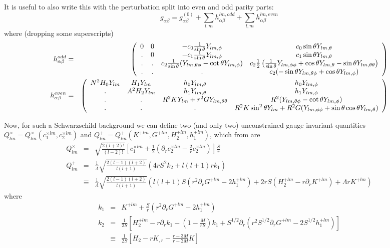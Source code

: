 \documentclass{article}
\begin{document}
It is useful to also write this with the perturbation split into even and odd parity parts:
$$
g_{\alpha\beta} = {g}^{(0)}_{\alpha\beta} +
   \sum_{l,m} h^{lm,odd}_{\alpha\beta}
+\sum_{l,m} h^{lm,even}_{\alpha\beta}
$$
where (dropping some superscripts)
\begin{eqnarray*}
h_{\alpha\beta}^{odd}
&=&
\left( 
\begin{array}{cccc}
0 & 0 &  - c_0\frac{1}{\sin\theta}Y_{lm,\phi}
    & c_0 \sin\theta Y_{lm,\theta}
\\
. & 0 & - c_1\frac{1}{\sin\theta} Y_{lm,\phi}
  & c_1 \sin\theta Y_{lm,\theta}
\\
. & . & c_2\frac{1}{\sin\theta}(Y_{lm,\theta\phi}-\cot\theta Y_{lm,\phi})  
  & c_2\frac{1}{2} \left(\frac{1}{\sin\theta}
          Y_{lm,\phi\phi}+\cos\theta Y_{lm,\theta}-\sin\theta Y_{lm,\theta\theta}\right)
\\
.&.&.&c_2 (-\sin\theta Y_{lm,\theta\phi}+\cos\theta Y_{lm,\phi})
\end{array}
\right)
\\
h_{\alpha\beta}^{even}
&=&
\left( 
\begin{array}{cccc}
N^2 H_0Y_{lm} & H_1Y_{lm}       & h_0Y_{lm,\theta}          & h_0 Y_{lm,\phi}             \\ 
.       & A^2H_2Y_{lm} & h_1Y_{lm,\theta}          & h_1 Y_{lm,\phi}             \\
.       & .           & R^2KY_{lm}+r^2GY_{lm,\theta\theta} & R^2(Y_{lm,\theta\phi}-\cot\theta Y_{lm,\phi}) \\
.       & .           & .                & R^2 K\sin^2\theta Y_{lm}+R^2G(Y_{lm,\phi\phi}+\sin\theta\cos\theta Y_{lm,\theta})
\end{array}
\right)
\end{eqnarray*}

Now, for such a Schwarzschild background we can define two (and only two)
unconstrained gauge invariant quantities 
  $Q^{\times}_{lm}=Q^{\times}_{lm}(c_1^{\times lm},c_2^{\times lm})$ 
and
  $Q^{+}_{lm}=Q^{+}_{lm}(K^{+ lm},G^{+ lm},H_2^{+lm},h_1^{+lm})$, 
which from
\cite{abrahams96a} are
\begin{eqnarray}
Q^{\times}_{lm} 
  & = & \sqrt{\frac{2(l+2)!}{(l-2)!}}\left[c_1^{\times lm}
        + \frac{1}{2}\left(\partial_r c_2^{\times lm} - \frac{2}{r}
        c_2^{\times lm}\right)\right] \frac{S}{r}
\\
Q^{+}_{lm}
  & = & \frac{1}{\Lambda}\sqrt{\frac{2(l-1)(l+2)}{l(l+1)}}
        (4rS^2 k_2+l(l+1)r k_1) 
\\
  & \equiv &
        \frac{1}{\Lambda}\sqrt{\frac{2(l-1)(l+2)}{l(l+1)}}
        \left(l(l+1)S(r^2\partial_r G^{+lm}-2h_1^{+lm})+
        2rS(H_2^{+lm}-r\partial_r K^{+lm})+\Lambda r K^{+lm}\right)
\end{eqnarray}
where
\begin{eqnarray}
k_1 & = & K^{+lm} + \frac{S}{r}(r^2\partial_r G^{+lm} - 2h^{+lm}_1) \\
k_2 & = & \frac{1}{2S}
          \left[H^{+lm}_2-r\partial_r k_1-\left(1-\frac{M}{rS}\right) 
            k_1 + S^{1/2}\partial_r
          (r^2 S^{1/2} \partial_r G^{+lm}-2S^{1/2}h_1^{+lm})\right]
\\
&\equiv& \frac{1}{2S}\left[H_2-rK_{,r}-\frac{r-3M}{r-2M}K\right]
\end{eqnarray}
\end{document}
